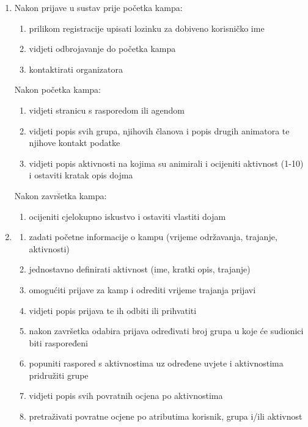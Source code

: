 \begin{enumerate}
	\item {}
	\newline Nakon prijave u sustav prije početka kampa:
	\begin{enumerate}
		\item prilikom registracije upisati lozinku za dobiveno korisničko ime
		\item vidjeti odbrojavanje do početka kampa
		\item kontaktirati organizatora
	\end{enumerate}
	Nakon početka kampa:
	\begin{enumerate}
		\item vidjeti stranicu s rasporedom ili agendom
		\item vidjeti popis svih grupa, njihovih članova i popis drugih animatora te njihove kontakt podatke
		\item vidjeti popis aktivnosti na kojima su animirali i ocijeniti aktivnost (1-10) i ostaviti kratak opis dojma
	\end{enumerate}	
	Nakon završetka kampa:
	\begin{enumerate}
		\item ocijeniti cjelokupno iskustvo i ostaviti vlastiti dojam\\
	\end{enumerate}
	
	\item {}
	\begin{enumerate}
		\item zadati početne informacije o kampu (vrijeme održavanja, trajanje, aktivnosti)
		\item jednostavno definirati aktivnost (ime, kratki opis, trajanje)
		\item omogućiti prijave za kamp i odrediti vrijeme trajanja prijavi
		\item vidjeti popis prijava te ih odbiti ili prihvatiti
		\item nakon završetka odabira prijava određivati broj grupa u koje će sudionici biti raspoređeni	
		\item popuniti raspored s aktivnostima uz određene uvjete i aktivnostima pridružiti grupe
		\item vidjeti popis svih povratnih ocjena po aktivnostima
		\item pretraživati povratne ocjene po atributima korisnik, grupa i/ili aktivnost\\
	\end{enumerate}
	

\end{enumerate}
